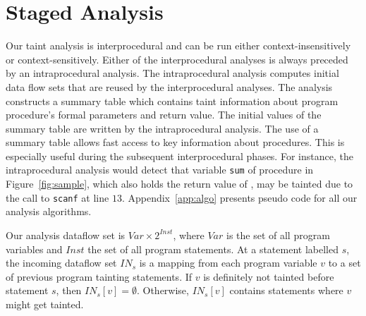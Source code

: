 \section{Staged Analysis}\label{sec:analysis}

\newcommand{\varset}{\mathit{Var}}
\newcommand{\instset}{\mathit{Inst}}
\newcommand{\procset}{\mathit{Proc}}
\newcommand{\formalsset}{\mathit{formals}}
\newcommand{\firstfunc}{\mathit{first}}
\newcommand{\toplevelfunc}{\mathit{toplevel}}
\newcommand{\pointsto}[2]{{pt}_{[#1]}(#2)}
\newcommand{\pointstobefore}[2]{{pt}_{[\overline{#1}]	}(#2)}
\newcommand{\pointstoafter}[2]{{pt}_{[\underline{#1}]}(#2)}

\newcommand{\myinflow}{\mathit{IN}}
\newcommand{\myoutflow}{\mathit{OUT}}
\newcommand{\ifff}{\mathit{iff}}
\newcommand{\aand}{\mathit{and}}
\newcommand{\mybigcup}[2]{\mathlarger{\bigcup_{#1}^{#2}}}

Our taint analysis is interprocedural and can be run
either context-insensitively or context-sensitively.
Either of the interprocedural analyses is always preceded
by an intraprocedural analysis. The intraprocedural analysis
computes initial data flow sets that are reused by the
interprocedural analyses.
The analysis constructs a summary table which contains
taint information about program procedure's formal
parameters and return value.
The initial values of the summary table are written by
the intraprocedural analysis. The use of a summary table
allows fast access to key information about procedures.
This is especially useful during the subsequent interprocedural
phases.
For instance, the intraprocedural analysis would
detect that variable \texttt{sum} of procedure \compute{} in
Figure~\ref{fig:sample}, which also holds the return
value of \compute{}, may be tainted due to the call
to \texttt{scanf} at line $13$.
Appendix~\ref{app:algo} presents pseudo code for all
our analysis algorithms.

Our analysis dataflow set is $\varset \times 2^\instset$,
where $\varset$ is the set of all program variables and
$\instset$ the set of all program statements. 
At a statement labelled $s$, the incoming dataflow set $\myinflow_s$
is a mapping from each program variable $v$ to a set of
previous program tainting statements.
If $v$ is definitely not tainted before statement $s$, then
$\myinflow_s[v] = \emptyset$. Otherwise, $\myinflow_s[v]$
contains statements where $v$ might get tainted.

